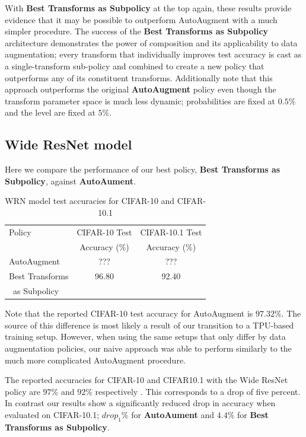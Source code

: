 \documentclass[10pt,twocolumn,letterpaper]{article}
\begin{document}
		With \textbf{Best Transforms as Subpolicy} at the top again, these results provide evidence that it may be possible to outperform AutoAugment with a much simpler procedure. The success of the \textbf{Best Transforms as Subpolicy} architecture demonstrates the power of composition and its applicability to data augmentation; every transform that individually improves test accuracy is cast as a single-transform sub-policy and combined to create a new policy that outperforms any of its constituent transforms. Additionally note that this approach outperforms the original \textbf{AutoAugment} policy even though the transform parameter space is much less dynamic; probabilities are fixed at $0.5\%$ and the level are fixed at $5\%$. 

	
	\subsection{Wide ResNet model \cite{Zagoruyko2016}}
	
		Here we compare the performance of our best policy, \textbf{Best Transforms as Subpolicy}, against \textbf{AutoAument}. 
	
		\begin{table}[h]
			\begin{tabular}{l|c|c}
				\hline
				Policy  &CIFAR-10 Test  &CIFAR-10.1 Test  \\
						&Accuracy (\%)  &Accuracy (\%) \\ \hline
				AutoAugment      				&???	&??? \\
				Best Transforms 			    &96.80	&92.40 \\
				\, as Subpolicy					&		&	 \\
			\end{tabular}
			\caption{WRN model \cite{Zagoruyko2016} test accuracies for CIFAR-10 and CIFAR-10.1}
		\end{table}
	
		Note that the reported CIFAR-10 test accuracy for AutoAugment is $97.32\%$. The source of this difference is most likely a result of our transition to a TPU-based training setup. However, when using the same setups that only differ by data augmentation policies, our naive approach was able to perform similarly to the much more complicated AutoAugment procedure.
		
		The reported accuracies for CIFAR-10 and CIFAR10.1 with the Wide ResNet policy are $97\%$ and $92\%$ respectively \cite{Recht2018}. This corresponds to a drop of five percent. In contrast our results show a significantly reduced drop in accuracy when evaluated on CIFAR-10.1; $drop_1\%$ for \textbf{AutoAument} and $4.4\%$ for \textbf{Best Transforms as Subpolicy}. 
	
\end{document}
